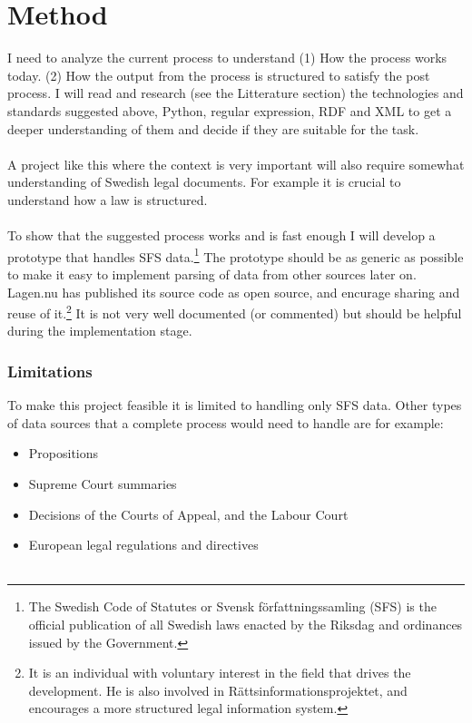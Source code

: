 \documentclass[12pt]{report}
\begin{document}
\section*{Method}
I need to analyze the current process to understand (1) How the process works today. (2) How the output from the process is structured to satisfy the post process. I will read and research (see the Litterature section) the technologies and standards suggested above, Python, regular expression, RDF and XML to get a deeper understanding of them and decide if they are suitable for the task.\\\\
A project like this where the context is very important will also require somewhat understanding of Swedish legal documents. For example it is crucial to understand how a law is structured.\\\\ 
To show that the suggested process works and is fast enough I will develop a prototype that handles SFS data.\footnote[5]{The Swedish Code of Statutes or Svensk författningssamling (SFS) is the official publication of all Swedish laws enacted by the Riksdag and ordinances issued by the Government.} The prototype should be as generic as possible to make it easy to implement parsing of data from other sources later on. Lagen.nu has published its source code as open source, and encurage sharing and reuse of it.\footnote[6]{It is an individual with voluntary interest in the field that drives the development. He is also involved in Rättsinformationsprojektet, and encourages a more structured legal information system.} It is not very well documented (or commented) but should be helpful during the implementation stage. 

\subsubsection*{Limitations}
To make this project feasible it is limited to handling only SFS data. Other types of data sources that a complete process would need to handle are for example:
\begin{itemize}
\item Propositions
\item Supreme Court summaries
\item Decisions of the Courts of Appeal, and the Labour Court
\item European legal regulations and directives\\\\
\end{itemize}
\end{document}
